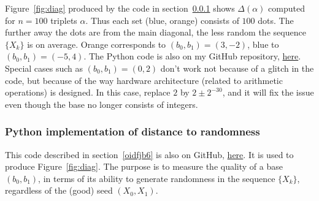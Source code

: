 \documentclass[oneside,10pt]{book}
\begin{document}
Figure~\ref{fig:diag} produced by the code in section~\ref{pulkh} shows $\Delta(\alpha)$ computed for $n=100$ triplets $\alpha$. Thus each set (blue, orange) consists of $100$ dots. The further away the dots are
 from the main diagonal, the less random the sequence $\{X_k\}$ is on average. Orange
corresponds to $(b_0,b_1)=(3, -2)$, blue to $(b_0,b_1)=(-5,4)$. The Python code is also on my GitHub repository,
\href{https://github.com/VincentGranville/Stochastic-Processes/blob/master/chaos_2D_base.py}{here}. Special cases such as
 $(b_0,b_1)=(0,2)$ don't work not because of a glitch in the code, but because of the way hardware architecture (related to arithmetic
 operations) is designed. In this case, replace $2$ by $2\pm 2^{-30}$, and it will fix the issue even though the base no longer
 consists of integers.

\subsubsection{Python implementation of distance to randomness}\label{pulkh}

This code described in section~\ref{oidfjb6} is also on GitHub, \href{https://github.com/VincentGranville/Stochastic-Processes/blob/master/chaos_2D_base.py}{here}. It is used to produce Figure~\ref{fig:diag}.
 The purpose is to measure the quality of a base $(b_0,b_1)$, in terms of its ability to generate randomness in the sequence
 $\{X_k\}$, regardless of the (good) seed $(X_0, X_1)$. \vspace{1ex}
\end{document}
